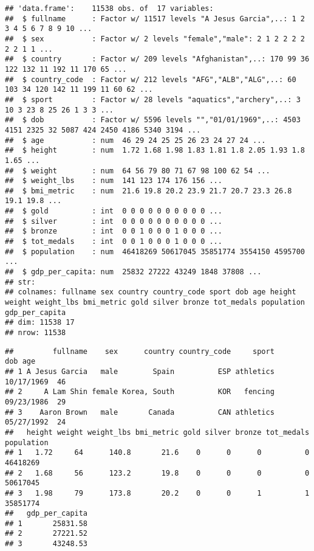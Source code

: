 \documentclass[]{article}
\newenvironment{Shaded}{\begin{snugshade}}{\end{snugshade}}
\newcommand{\CommentTok}[1]{\textcolor[rgb]{0.56,0.35,0.01}{\textit{#1}}}
\begin{document}
\begin{verbatim}
## 'data.frame':    11538 obs. of  17 variables:
##  $ fullname      : Factor w/ 11517 levels "A Jesus Garcia",..: 1 2 3 4 5 6 7 8 9 10 ...
##  $ sex           : Factor w/ 2 levels "female","male": 2 1 2 2 2 2 2 2 1 1 ...
##  $ country       : Factor w/ 209 levels "Afghanistan",..: 170 99 36 122 132 11 192 11 170 65 ...
##  $ country_code  : Factor w/ 212 levels "AFG","ALB","ALG",..: 60 103 34 120 142 11 199 11 60 62 ...
##  $ sport         : Factor w/ 28 levels "aquatics","archery",..: 3 10 3 23 8 25 26 1 3 3 ...
##  $ dob           : Factor w/ 5596 levels "","01/01/1969",..: 4503 4151 2325 32 5087 424 2450 4186 5340 3194 ...
##  $ age           : num  46 29 24 25 25 26 23 24 27 24 ...
##  $ height        : num  1.72 1.68 1.98 1.83 1.81 1.8 2.05 1.93 1.8 1.65 ...
##  $ weight        : num  64 56 79 80 71 67 98 100 62 54 ...
##  $ weight_lbs    : num  141 123 174 176 156 ...
##  $ bmi_metric    : num  21.6 19.8 20.2 23.9 21.7 20.7 23.3 26.8 19.1 19.8 ...
##  $ gold          : int  0 0 0 0 0 0 0 0 0 0 ...
##  $ silver        : int  0 0 0 0 0 0 0 0 0 0 ...
##  $ bronze        : int  0 0 1 0 0 0 1 0 0 0 ...
##  $ tot_medals    : int  0 0 1 0 0 0 1 0 0 0 ...
##  $ population    : num  46418269 50617045 35851774 3554150 4595700 ...
##  $ gdp_per_capita: num  25832 27222 43249 1848 37808 ...
## str: 
## colnames: fullname sex country country_code sport dob age height weight weight_lbs bmi_metric gold silver bronze tot_medals population gdp_per_capita 
## dim: 11538 17 
## nrow: 11538
\end{verbatim}

\begin{verbatim}
##         fullname    sex      country country_code     sport        dob age
## 1 A Jesus Garcia   male        Spain          ESP athletics 10/17/1969  46
## 2     A Lam Shin female Korea, South          KOR   fencing 09/23/1986  29
## 3    Aaron Brown   male       Canada          CAN athletics 05/27/1992  24
##   height weight weight_lbs bmi_metric gold silver bronze tot_medals population
## 1   1.72     64      140.8       21.6    0      0      0          0   46418269
## 2   1.68     56      123.2       19.8    0      0      0          0   50617045
## 3   1.98     79      173.8       20.2    0      0      1          1   35851774
##   gdp_per_capita
## 1       25831.58
## 2       27221.52
## 3       43248.53
\end{verbatim}

\begin{Shaded}
\end{Shaded}
\end{document}
